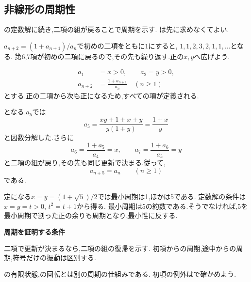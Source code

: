 \subsection{非線形の周期性}\label{節：非線形の周期性}
  の定数解に続き,二項の組が戻ることで周期を示す.
  は先に求めなくてよい.

  $a_{n+2}=(1+a_{n+1})/a_n$で初めの二項をともに$1$にすると,
  $1,1,2,3,2,1,1,\ldots$となる.
  第6,7項が初めの二項に戻るので,その先も繰り返す.正の$x,y$へ広げよう.

  \[
    \begin{aligned}
      a_1&=x>0,\qquad a_2=y>0,\\
      a_{n+2}&=\frac{1+a_{n+1}}{a_n}\quad(n\ge1)
    \end{aligned}
  \]
  とする.正の二項から次も正になるため,すべての項が定義される.

  \BookMathLayout{\[
    a_3=\frac{1+y}{x},\qquad
    a_4=\frac{1+x+y}{xy},\qquad
    a_5=\frac{1+x}{y}
  \]}{\[
    \begin{aligned}
      a_3&=\frac{1+y}{x},\\
      a_4&=\frac{1+x+y}{xy},\\
      a_5&=\frac{1+x}{y}
    \end{aligned}
  \]}
  となる.$a_5$では
  \[
    a_5=\frac{xy+1+x+y}{y(1+y)}=\frac{1+x}{y}
  \]
  と因数分解した.さらに
  \[
    a_6=\frac{1+a_5}{a_4}=x,\qquad
    a_7=\frac{1+a_6}{a_5}=y
  \]
  と二項の組が戻り,その先も同じ更新で決まる.従って,
  \[
    a_{n+5}=a_n\qquad(n\ge1)
  \]
  である.

  定になる$x=y=(1+\sqrt5)/2$では最小周期は1,ほかは5である.
  定数解の条件は$x=y=t>0$, $t^2=t+1$から得る.
  最小周期は5の約数である.そうでなければ,5を最小周期で割った正の余りも周期となり,最小性に反する.

  \begin{bookpoint}
    \textbf{周期を証明する条件}\par
    二項で更新が決まるなら,二項の組の復帰を示す.
    初項からの周期,途中からの周期,符号だけの振動は区別する.
  \end{bookpoint}
  の有限状態,の回転とは別の周期の仕組みである.
  初項の例外はで確かめよう.
